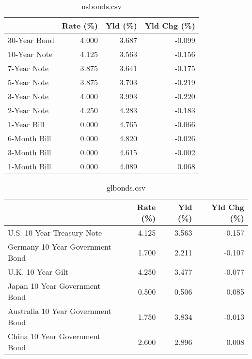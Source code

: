 \documentclass{article}%
\begin{document}
%


\begin{table}[htbp]%
\caption{usbonds.csv}%
\centering%
\begin{adjustbox}{width=1\textwidth}%
\begin{tabular}{lrrr}
\toprule
             &  Rate (\%) &  Yld (\%) &  Yld Chg (\%) \\
\midrule
30-Year Bond &     4.000 &    3.687 &       -0.099 \\
10-Year Note &     4.125 &    3.563 &       -0.156 \\
 7-Year Note &     3.875 &    3.641 &       -0.175 \\
 5-Year Note &     3.875 &    3.703 &       -0.219 \\
 3-Year Note &     4.000 &    3.993 &       -0.220 \\
 2-Year Note &     4.250 &    4.283 &       -0.183 \\
 1-Year Bill &     0.000 &    4.765 &       -0.066 \\
6-Month Bill &     0.000 &    4.820 &       -0.026 \\
3-Month Bill &     0.000 &    4.615 &       -0.002 \\
1-Month Bill &     0.000 &    4.089 &        0.068 \\
\bottomrule
\end{tabular}
%
\end{adjustbox}%
\end{table}

%


\begin{table}[htbp]%
\caption{glbonds.csv}%
\centering%
\begin{adjustbox}{width=1\textwidth}%
\begin{tabular}{lrrr}
\toprule
                                  &  Rate (\%) &  Yld (\%) &  Yld Chg (\%) \\
\midrule
       U.S. 10 Year Treasury Note &     4.125 &    3.563 &       -0.157 \\
  Germany 10 Year Government Bond &     1.700 &    2.211 &       -0.107 \\
                U.K. 10 Year Gilt &     4.250 &    3.477 &       -0.077 \\
    Japan 10 Year Government Bond &     0.500 &    0.506 &        0.085 \\
Australia 10 Year Government Bond &     1.750 &    3.834 &       -0.013 \\
    China 10 Year Government Bond &     2.600 &    2.896 &        0.008 \\
\bottomrule
\end{tabular}
%
\end{adjustbox}%
\end{table}
\end{document}
